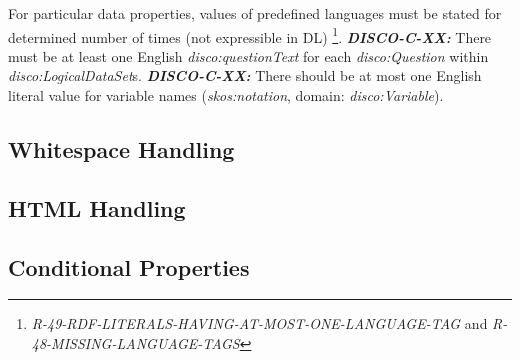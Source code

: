 \documentclass{llncs}
\begin{document}
For particular data properties, values of predefined languages must be stated for determined number of times (not expressible in DL)
\footnote{{\em R-49-RDF-LITERALS-HAVING-AT-MOST-ONE-LANGUAGE-TAG} and {\em R-48-MISSING-LANGUAGE-TAGS}}.
\textbf{{\em DISCO-C-XX:}}
There must be at least one English {\em disco:questionText} for each {\em disco:Question} within {\em disco:LogicalDataSet}s.
\textbf{{\em DISCO-C-XX:}}
There should be at most one English literal value for variable names ({\em skos:notation}, domain: {\em disco:Variable}).

\subsection{Whitespace Handling}

\subsection{HTML Handling}

\subsection{Conditional Properties}
\end{document}
